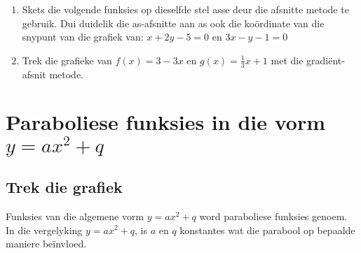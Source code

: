 \begin{exercises}{}
{\begin{enumerate}[noitemsep, label=\textbf{\arabic*}. ]
\begin{figure}[H]
\end{figure}   
\item Skets die volgende funksies op dieselfde stel asse deur die afsnitte metode te gebruik. Dui duidelik die as-afsnitte aan as ook die ko\"ordinate van die snypunt van die grafiek van: $x+2y-5=0$ en $3x-y-1=0$
\item Trek die grafieke van $f(x)=3-3x$ en $g(x)=\frac{1}{3}x+1$ met die gradi\"ent-afsnit metode.
\end{enumerate}

}
\end{exercises}
   

\section{Paraboliese funksies in die vorm $y=a{x}^{2}+q$}
\subsection*{Trek die grafiek}         
Funksies van die algemene vorm  $y=a{x}^{2}+q$  word paraboliese funksies genoem. In die vergelyking $y=a{x}^{2}+q$, is $a$ en $q$ konstantes wat die parabool op bepaalde maniere be\"invloed. 
\par
{}


